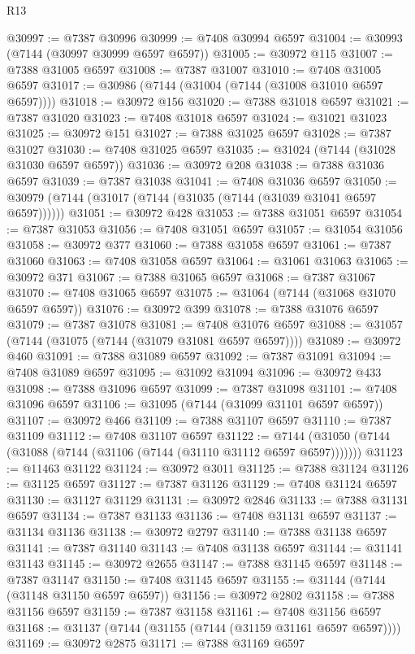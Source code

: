 \begin{lexlean}{R13}
\begin{coremodule}
@30997 := @7387 @30996
@30999 := @7408 @30994 @6597
@31004 := @30993 (@7144 (@30997 @30999 @6597 @6597))
@31005 := @30972 @115
@31007 := @7388 @31005 @6597
@31008 := @7387 @31007
@31010 := @7408 @31005 @6597
@31017 := @30986 (@7144 (@31004 (@7144 (@31008 @31010 @6597 @6597))))
@31018 := @30972 @156
@31020 := @7388 @31018 @6597
@31021 := @7387 @31020
@31023 := @7408 @31018 @6597
@31024 := @31021 @31023
@31025 := @30972 @151
@31027 := @7388 @31025 @6597
@31028 := @7387 @31027
@31030 := @7408 @31025 @6597
@31035 := @31024 (@7144 (@31028 @31030 @6597 @6597))
@31036 := @30972 @208
@31038 := @7388 @31036 @6597
@31039 := @7387 @31038
@31041 := @7408 @31036 @6597
@31050 := @30979 (@7144 (@31017 (@7144 (@31035 (@7144 (@31039 @31041 @6597 @6597))))))
@31051 := @30972 @428
@31053 := @7388 @31051 @6597
@31054 := @7387 @31053
@31056 := @7408 @31051 @6597
@31057 := @31054 @31056
@31058 := @30972 @377
@31060 := @7388 @31058 @6597
@31061 := @7387 @31060
@31063 := @7408 @31058 @6597
@31064 := @31061 @31063
@31065 := @30972 @371
@31067 := @7388 @31065 @6597
@31068 := @7387 @31067
@31070 := @7408 @31065 @6597
@31075 := @31064 (@7144 (@31068 @31070 @6597 @6597))
@31076 := @30972 @399
@31078 := @7388 @31076 @6597
@31079 := @7387 @31078
@31081 := @7408 @31076 @6597
@31088 := @31057 (@7144 (@31075 (@7144 (@31079 @31081 @6597 @6597))))
@31089 := @30972 @460
@31091 := @7388 @31089 @6597
@31092 := @7387 @31091
@31094 := @7408 @31089 @6597
@31095 := @31092 @31094
@31096 := @30972 @433
@31098 := @7388 @31096 @6597
@31099 := @7387 @31098
@31101 := @7408 @31096 @6597
@31106 := @31095 (@7144 (@31099 @31101 @6597 @6597))
@31107 := @30972 @466
@31109 := @7388 @31107 @6597
@31110 := @7387 @31109
@31112 := @7408 @31107 @6597
@31122 := @7144 (@31050 (@7144 (@31088 (@7144 (@31106 (@7144 (@31110 @31112 @6597 @6597)))))))
@31123 := @11463 @31122
@31124 := @30972 @3011
@31125 := @7388 @31124
@31126 := @31125 @6597
@31127 := @7387 @31126
@31129 := @7408 @31124 @6597
@31130 := @31127 @31129
@31131 := @30972 @2846
@31133 := @7388 @31131 @6597
@31134 := @7387 @31133
@31136 := @7408 @31131 @6597
@31137 := @31134 @31136
@31138 := @30972 @2797
@31140 := @7388 @31138 @6597
@31141 := @7387 @31140
@31143 := @7408 @31138 @6597
@31144 := @31141 @31143
@31145 := @30972 @2655
@31147 := @7388 @31145 @6597
@31148 := @7387 @31147
@31150 := @7408 @31145 @6597
@31155 := @31144 (@7144 (@31148 @31150 @6597 @6597))
@31156 := @30972 @2802
@31158 := @7388 @31156 @6597
@31159 := @7387 @31158
@31161 := @7408 @31156 @6597
@31168 := @31137 (@7144 (@31155 (@7144 (@31159 @31161 @6597 @6597))))
@31169 := @30972 @2875
@31171 := @7388 @31169 @6597

\end{coremodule}
\end{lexlean}
